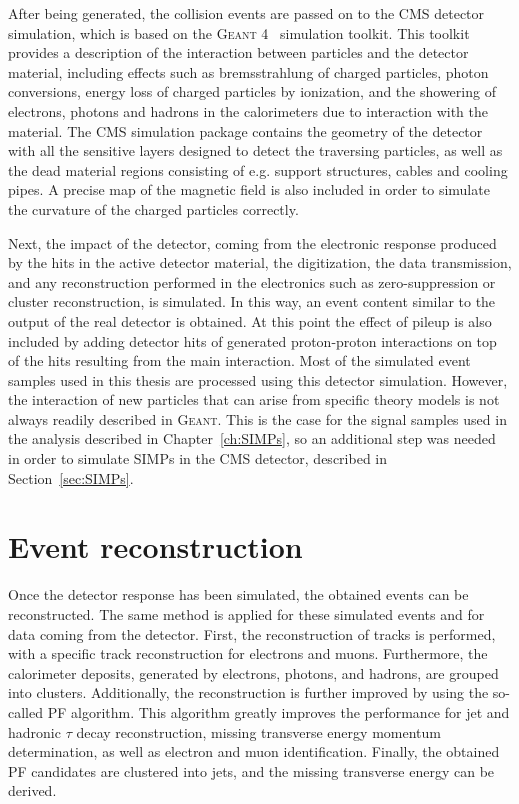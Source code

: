 After being generated, the collision events are passed on to the \ac{CMS} detector simulation, which is based on the \textsc{Geant 4}~\cite{Allison:2006ve} simulation toolkit. This toolkit provides a description of the interaction between particles and the detector material, including effects such as bremsstrahlung of charged particles, photon conversions, energy loss of charged particles by ionization, and the showering of electrons, photons and hadrons in the calorimeters due to interaction with the material. The \ac{CMS} simulation package contains the geometry of the detector with all the sensitive layers designed to detect the traversing particles, as well as the dead material regions consisting of e.g. support structures, cables and cooling pipes. A precise map of the magnetic field is also included in order to simulate the curvature of the charged particles correctly.

Next, the impact of the detector, coming from the electronic response produced by the hits in the active detector material, the digitization, the data transmission, and any reconstruction performed in the electronics such as zero-suppression or cluster reconstruction, is simulated. In this way, an event content similar to the output of the real detector is obtained. At this point the effect of pileup is also included by adding detector hits of generated proton-proton interactions on top of the hits resulting from the main interaction. Most of the simulated event samples used in this thesis are processed using this detector simulation. However, the interaction of new particles that can arise from specific theory models is not always readily described in \textsc{Geant}. This is the case for the signal samples used in the analysis described in Chapter~\ref{ch:SIMPs}, so an additional step was needed in order to simulate \acfp{SIMP} in the \ac{CMS} detector, described in Section~\ref{sec:SIMPs}. 

\section{Event reconstruction}
\label{sec:reconstruction}

Once the detector response has been simulated, the obtained events can be reconstructed. The same method is applied for these simulated events and for data coming from the detector. First, the reconstruction of tracks is performed, with a specific track reconstruction for electrons and muons. Furthermore, the calorimeter deposits, generated by electrons, photons, and hadrons, are grouped into clusters. Additionally, the reconstruction is further improved by using the so-called \acf{PF} algorithm. This algorithm greatly improves the performance for jet and hadronic $\tau$ decay reconstruction, missing transverse energy momentum determination, as well as electron and muon identification. Finally, the obtained \ac{PF} candidates are clustered into jets, and the missing transverse energy can be derived.

